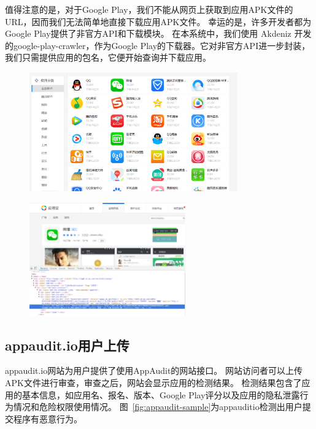 值得注意的是，对于Google Play，我们不能从网页上获取到应用APK文件的URL，因而我们无法简单地直接下载应用APK文件。
幸运的是，许多开发者都为Google Play提供了非官方API和下载模块。
在本系统中，我们使用 Akdeniz 开发的google-play-crawler，作为Google Play的下载器。它对非官方API进一步封装，我们只需提供应用的包名，它便开始查询并下载应用。

\begin{figure}
	\centering
	\includegraphics[width=0.8\textwidth]{figure/myapp-popular.png}
\end{figure}

\begin{figure}
	\centering
	\includegraphics[width=0.6\textwidth]{figure/wechat-detail.png}
\end{figure}


\subsection{appaudit.io用户上传}

appaudit.io网站为用户提供了使用AppAudit的网站接口。
网站访问者可以上传APK文件进行审查，审查之后，网站会显示应用的检测结果。
检测结果包含了应用的基本信息，如应用名、报名、版本、Google Play评分以及应用的隐私泄露行为情况和危险权限使用情况。
图~\ref{fig:appaudit-sample}为appauditio检测出用户提交程序有恶意行为。

